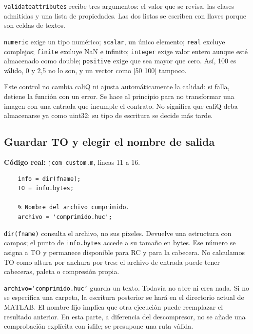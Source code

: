 \documentclass[11pt,a4paper,oneside]{report}
\begin{document}
\texttt{validateattributes} recibe tres argumentos: el valor que se revisa,
las clases admitidas y una lista de propiedades. Las dos listas se escriben
con llaves porque son celdas de textos.

\texttt{numeric} exige un tipo numérico; \texttt{scalar}, un único elemento;
\texttt{real} excluye complejos; \texttt{finite} excluye NaN e infinito;
\texttt{integer} exige valor entero aunque esté almacenado como double;
\texttt{positive} exige que sea mayor que cero. Así, 100 es válido, 0 y 2,5
no lo son, y un vector como [50 100] tampoco.

Este control no cambia caliQ ni ajusta automáticamente la calidad: si falla,
detiene la función con un error. Se hace al principio para no transformar
una imagen con una entrada que incumple el contrato. No significa que caliQ
deba almacenarse ya como uint32: su tipo de escritura se decide más tarde.


\par\medskip\noindent\begin{minipage}{\linewidth}

\subsection{Guardar TO y elegir el nombre de salida}

\textbf{Código real:} \texttt{jcom\_custom.m}, líneas 11 a 16.

\begin{lstlisting}[firstnumber=11]
    % Tamano original en bytes, necesario para calcular RC al final.
    info = dir(fname);
    TO = info.bytes;

    % Nombre del archivo comprimido.
    archivo = 'comprimido.huc';
\end{lstlisting}

\end{minipage}\par


\texttt{dir(fname)} consulta el archivo, no sus píxeles. Devuelve una estructura
con campos; el punto de \texttt{info.bytes} accede a su tamaño en bytes.
Ese número se asigna a TO y permanece disponible para RC y para la cabecera.
No calculamos TO como altura por anchura por tres: el archivo de entrada
puede tener cabeceras, paleta o compresión propia.

\texttt{archivo='comprimido.huc'} guarda un texto. Todavía no abre ni crea
nada. Si no se especifica una carpeta, la escritura posterior se hará en el
directorio actual de MATLAB. El nombre fijo implica que otra ejecución puede
reemplazar el resultado anterior. En esta parte, a diferencia del descompresor,
no se añade una comprobación explícita con isfile; se presupone una ruta válida.
\end{document}
